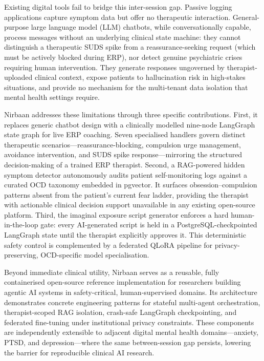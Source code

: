 \documentclass[preprint,12pt,a4paper]{elsarticle}
\begin{document}
Existing digital tools fail to bridge this inter-session gap. Passive logging applications capture symptom data but offer no therapeutic interaction. General-purpose large language model (LLM) chatbots, while conversationally capable, process messages without an underlying clinical state machine: they cannot distinguish a therapeutic SUDS spike from a reassurance-seeking request (which must be actively blocked during ERP), nor detect genuine psychiatric crises requiring human intervention. They generate responses ungoverned by therapist-uploaded clinical context, expose patients to hallucination risk in high-stakes situations, and provide no mechanism for the multi-tenant data isolation that mental health settings require.

Nirbaan addresses these limitations through three specific contributions. First, it replaces generic chatbot design with a clinically modelled nine-node LangGraph state graph for live ERP coaching. Seven specialised handlers govern distinct therapeutic scenarios---reassurance-blocking, compulsion urge management, avoidance intervention, and SUDS spike response---mirroring the structured decision-making of a trained ERP therapist. Second, a RAG-powered hidden symptom detector autonomously audits patient self-monitoring logs against a curated OCD taxonomy embedded in pgvector. It surfaces obsession--compulsion patterns absent from the patient's current fear ladder, providing the therapist with actionable clinical decision support unavailable in any existing open-source platform. Third, the imaginal exposure script generator enforces a hard human-in-the-loop gate: every AI-generated script is held in a PostgreSQL-checkpointed LangGraph state until the therapist explicitly approves it. This deterministic safety control is complemented by a federated QLoRA pipeline for privacy-preserving, OCD-specific model specialisation.

Beyond immediate clinical utility, Nirbaan serves as a reusable, fully containerised open-source reference implementation for researchers building agentic AI systems in safety-critical, human-supervised domains. Its architecture demonstrates concrete engineering patterns for stateful multi-agent orchestration, therapist-scoped RAG isolation, crash-safe LangGraph checkpointing, and federated fine-tuning under institutional privacy constraints. These components are independently extensible to adjacent digital mental health domains---anxiety, PTSD, and depression---where the same between-session gap persists, lowering the barrier for reproducible clinical AI research.
\end{document}
